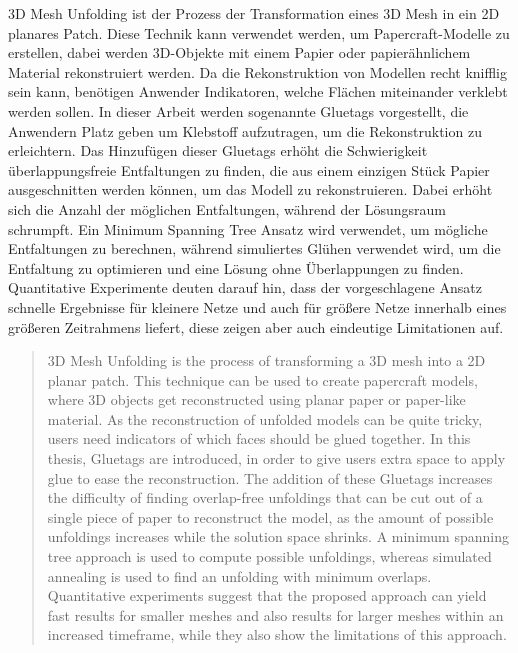 \documentclass[draft,final]{vutinfth} %
\begin{document}
\begin{kurzfassung}
3D Mesh Unfolding ist der Prozess der Transformation eines 3D Mesh in ein 2D planares Patch. Diese Technik kann verwendet werden, um Papercraft-Modelle zu erstellen, dabei werden 3D-Objekte mit einem Papier oder papierähnlichem Material rekonstruiert werden. Da die Rekonstruktion von Modellen recht knifflig sein kann, benötigen Anwender Indikatoren, welche Flächen miteinander verklebt werden sollen. In dieser Arbeit werden sogenannte Gluetags vorgestellt, die Anwendern Platz geben um Klebstoff aufzutragen, um die Rekonstruktion zu erleichtern. Das Hinzufügen dieser Gluetags erhöht die Schwierigkeit überlappungsfreie Entfaltungen zu finden, die aus einem einzigen Stück Papier ausgeschnitten werden können, um das Modell zu rekonstruieren. Dabei erhöht sich die Anzahl der möglichen Entfaltungen, während der Lösungsraum schrumpft. Ein Minimum Spanning Tree Ansatz wird verwendet, um mögliche Entfaltungen zu berechnen, während simuliertes Glühen verwendet wird, um die Entfaltung zu optimieren und eine Lösung ohne Überlappungen zu finden. Quantitative Experimente deuten darauf hin, dass der vorgeschlagene Ansatz schnelle Ergebnisse für kleinere Netze und auch für größere Netze innerhalb eines größeren Zeitrahmens liefert, diese zeigen aber auch eindeutige Limitationen auf.
\end{kurzfassung}

\begin{abstract}
3D Mesh Unfolding is the process of transforming a 3D mesh into a 2D planar patch. This technique can be used to create papercraft models, where 3D objects get reconstructed using planar paper or paper-like material. As the reconstruction of unfolded models can be quite tricky, users need indicators of which faces should be glued together. In this thesis, Gluetags are introduced, in order to give users extra space to apply glue to ease the reconstruction. The addition of these Gluetags increases the difficulty of finding overlap-free unfoldings that can be cut out of a single piece of paper to reconstruct the model, as the amount of possible unfoldings increases while the solution space shrinks. A minimum spanning tree approach is used to compute possible unfoldings, whereas simulated annealing is used to find an unfolding with minimum overlaps. Quantitative experiments suggest that the proposed approach can yield fast results for smaller meshes and also results for larger meshes within an increased timeframe, while they also show the limitations of this approach.
\end{abstract}
\end{document}
